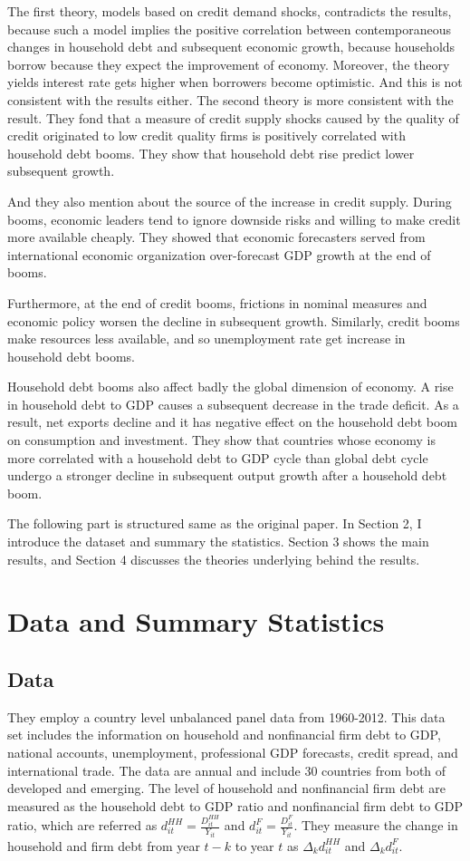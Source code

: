 \documentclass{ltjarticle}
\begin{document}
The first theory, models based on credit demand shocks, contradicts the results, because such a model implies the positive correlation between contemporaneous changes in household debt and subsequent economic growth, because households borrow because they expect the improvement of economy. Moreover, the theory yields interest rate gets higher when borrowers become optimistic. And this is not consistent with the results either.
The second theory is more consistent with the result. They fond that a measure of credit supply shocks caused by the quality of credit originated to low credit quality firms is positively correlated with household debt booms. They show that household debt rise predict lower subsequent growth.

And they also mention about the source of the increase in credit supply. During booms, economic leaders tend to ignore downside risks and willing to make credit more available cheaply. They showed that economic forecasters served from international economic organization over-forecast GDP growth at the end of booms. 

Furthermore, at the end of credit booms, frictions in nominal measures and economic policy worsen the decline in subsequent growth. Similarly, credit booms make resources less available, and so unemployment rate get increase in household debt booms.

Household debt booms also affect badly the global dimension of economy. A rise in household debt to GDP causes a subsequent decrease in the trade deficit. As a result, net exports decline and it has negative effect on the household debt boom on consumption and investment. They show that countries whose economy is more correlated with a household debt to GDP cycle than global debt cycle undergo a stronger decline in subsequent output growth after a household debt boom.

The following part is structured same as the original paper. In Section 2, I introduce the dataset and summary the statistics. Section 3 shows the main results, and Section 4 discusses the theories underlying behind the results.

\section{Data and Summary Statistics}
\subsection{Data}
They employ a country level unbalanced panel data from 1960-2012. This data set includes the information on household and nonfinancial firm debt to GDP, national accounts, unemployment, professional GDP forecasts, credit spread, and international trade. The data are annual and include 30 countries from both of developed and emerging. The level of household and nonfinancial firm debt are measured as the household debt to GDP ratio and nonfinancial firm debt to GDP ratio, which are referred as $d_{it}^{HH}=\frac{D_{it}^{HH}}{Y_{it}}$ and $d_{it}^{F}=\frac{D_{it}^{F}}{Y_{it}}$. They measure the change in household and firm debt from year $t-k$ to year $t$ as $\Delta_{k} d_{it}^{HH} $ and $\Delta_{k}d_{it}^{F} $.
\end{document}

